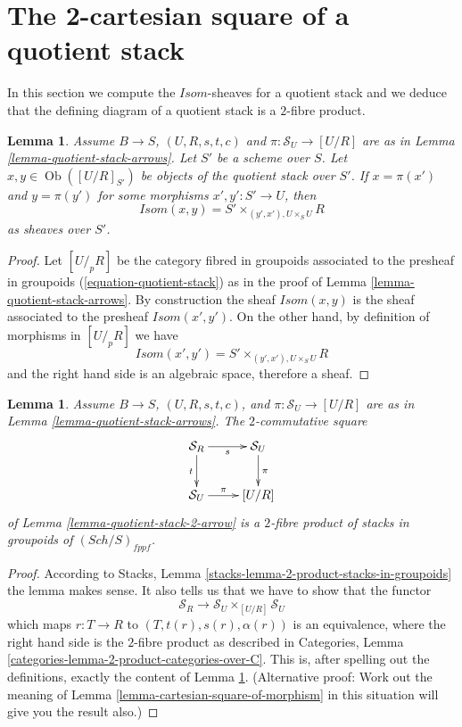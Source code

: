 \documentclass{stacks-project}
\theoremstyle{plain}
\newtheorem{lemma}[subsection]{Lemma}
\theoremstyle{definition}
\theoremstyle{remark}
\numberwithin{equation}{subsection}
\def\Sch{\mathit{Sch}}
\def\Ob{\mathop{\mathrm{Ob}}\nolimits}
\begin{document}
\section{The 2-cartesian square of a quotient stack}
\label{section-quotient-stack-2-cartesian}

\noindent
In this section we compute the $\mathit{Isom}$-sheaves for a quotient stack
and we deduce that the defining diagram of a quotient stack is a
$2$-fibre product.

\begin{lemma}
\label{lemma-quotient-stack-morphisms}
Assume $B \to S$, $(U, R, s, t, c)$ and $\pi : \mathcal{S}_U \to [U/R]$
are as in
Lemma \ref{lemma-quotient-stack-arrows}.
Let $S'$ be a scheme over $S$.
Let $x, y \in \Ob([U/R]_{S'})$ be objects of the
quotient stack over $S'$. If $x = \pi(x')$ and $y = \pi(y')$ for
some morphisms $x', y' : S' \to U$, then
$$
\mathit{Isom}(x, y) = S' \times_{(y', x'), U \times_S U} R
$$
as sheaves over $S'$.
\end{lemma}

\begin{proof}
Let $[U/_{\!p}R]$ be the category fibred in groupoids associated to
the presheaf in groupoids (\ref{equation-quotient-stack}) as in the proof of
Lemma \ref{lemma-quotient-stack-arrows}.
By construction the sheaf $\mathit{Isom}(x, y)$ is the sheaf associated
to the presheaf $\mathit{Isom}(x', y')$. On the other hand, by definition
of morphisms in $[U/_{\!p}R]$ we have
$$
\mathit{Isom}(x', y') = S' \times_{(y', x'), U \times_S U} R
$$
and the right hand side is an algebraic space, therefore a sheaf.
\end{proof}

\begin{lemma}
\label{lemma-quotient-stack-2-cartesian}
Assume $B \to S$, $(U, R, s, t, c)$, and $\pi : \mathcal{S}_U \to [U/R]$
are as in
Lemma \ref{lemma-quotient-stack-arrows}.
The $2$-commutative square
$$
\xymatrix{
\mathcal{S}_R \ar[r]_s \ar[d]_t & \mathcal{S}_U \ar[d]^\pi \\
\mathcal{S}_U \ar[r]^-\pi & [U/R]
}
$$
of
Lemma \ref{lemma-quotient-stack-2-arrow}
is a $2$-fibre product of stacks in groupoids of $(\Sch/S)_{fppf}$.
\end{lemma}

\begin{proof}
According to
Stacks, Lemma \ref{stacks-lemma-2-product-stacks-in-groupoids}
the lemma makes sense. It also tells us that we have to show that
the functor
$$
\mathcal{S}_R \longrightarrow \mathcal{S}_U \times_{[U/R]} \mathcal{S}_U
$$
which maps $r : T \to R$ to $(T, t(r), s(r), \alpha(r))$ is an equivalence,
where the right hand side is the $2$-fibre product as described in
Categories, Lemma \ref{categories-lemma-2-product-categories-over-C}.
This is, after spelling out the definitions, exactly the content of
Lemma \ref{lemma-quotient-stack-morphisms}. (Alternative proof: Work out
the meaning of
Lemma \ref{lemma-cartesian-square-of-morphism}
in this situation will give you the result also.)
\end{proof}
\end{document}
